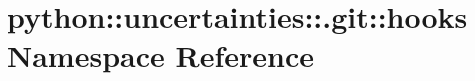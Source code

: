 \hypertarget{namespacepython_1_1uncertainties_1_1_8git_1_1hooks}{
\section{python::uncertainties::.git::hooks Namespace Reference}
\label{namespacepython_1_1uncertainties_1_1_8git_1_1hooks}
}
